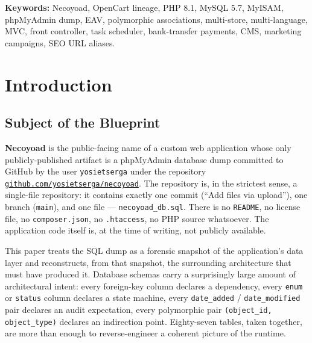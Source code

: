 \documentclass[11pt,a4paper]{article}
\begin{document}
\vspace{0.6em}
\noindent\textbf{Keywords:} Necoyoad, OpenCart lineage, PHP 8.1, MySQL 5.7,
MyISAM, phpMyAdmin dump, EAV, polymorphic associations, multi-store, multi-language,
MVC, front controller, task scheduler, bank-transfer payments, CMS,
marketing campaigns, SEO URL aliases.

\newpage

\tableofcontents
\newpage

\section{Introduction}\label{sec:intro}

\subsection{Subject of the Blueprint}

\textbf{Necoyoad} is the public-facing name of a custom web application whose
only publicly-published artifact is a phpMyAdmin database dump committed to
GitHub by the user \texttt{yosietserga} under the repository
\href{https://github.com/yosietserga/necoyoad}{\texttt{github.com/yosietserga/necoyoad}}.
The repository is, in the strictest sense, a single-file repository: it contains
exactly one commit (``Add files via upload''), one branch (\texttt{main}), and
one file --- \texttt{necoyoad\_db.sql}. There is no \texttt{README}, no
license file, no \texttt{composer.json}, no \texttt{.htaccess}, no PHP source
whatsoever. The application code itself is, at the time of writing, not
publicly available.

This paper treats the SQL dump as a forensic snapshot of the application's
data layer and reconstructs, from that snapshot, the surrounding architecture
that must have produced it. Database schemas carry a surprisingly large amount
of architectural intent: every foreign-key column declares a dependency, every
\texttt{enum} or \texttt{status} column declares a state machine, every
\texttt{date\_added} / \texttt{date\_modified} pair declares an audit
expectation, every polymorphic pair \texttt{(object\_id, object\_type)}
declares an indirection point. Eighty-seven tables, taken together, are more
than enough to reverse-engineer a coherent picture of the runtime.
\end{document}
